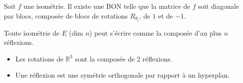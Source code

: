 \documentclass[french]{yLectureNote}
\newcommand{\R}[0]{\mathbb{R}}
\begin{document}
\begin{theorem}
    Soit $f$ une isométrie. Il existe une BON telle que la matrice de $f$ soit diagonale par blocs, composée de blocs de rotations $R_{\theta_i}$, de $1$ et de $-1$.
\end{theorem}

\begin{theorem}
    Toute isométrie de $E$ (dim $n$) peut s'écrire comme la composée d'au plus $n$ réflexions.
    \begin{itemize}
        \item Les rotations de $\R^3$ sont la composée de 2 réflexions.
        \item Une réflexion est une symétrie orthogonale par rapport à un hyperplan.
    \end{itemize}
\end{theorem}
\end{document}
